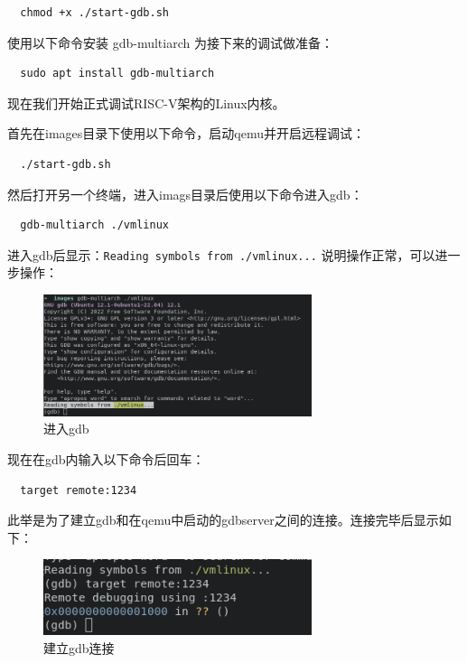 \documentclass[lang=cn,10pt]{elegantbook}
\begin{document}
\begin{lstlisting}
  chmod +x ./start-gdb.sh
\end{lstlisting}

使用以下命令安装 gdb-multiarch 为接下来的调试做准备：
\begin{lstlisting}
  sudo apt install gdb-multiarch
\end{lstlisting}

现在我们开始正式调试RISC-V架构的Linux内核。

首先在images目录下使用以下命令，启动qemu并开启远程调试：
\begin{lstlisting}
  ./start-gdb.sh
\end{lstlisting}

然后打开另一个终端，进入imags目录后使用以下命令进入gdb：

\begin{lstlisting}
  gdb-multiarch ./vmlinux
\end{lstlisting}

进入gdb后显示：\lstinline{Reading symbols from ./vmlinux...} 说明操作正常，可以进一步操作：

\begin{figure}[htbp]
  \centering
  \includegraphics[width=0.7\textwidth]{image/image-20231105111831194.png}
  \caption{进入gdb}
\end{figure}

现在在gdb内输入以下命令后回车：

\begin{lstlisting}
  target remote:1234
\end{lstlisting}

此举是为了建立gdb和在qemu中启动的gdbserver之间的连接。连接完毕后显示如下：

\begin{figure}[htbp]
  \centering
  \includegraphics[width=0.7\textwidth]{image/image-20231105112104038.png}
  \caption{建立gdb连接}
\end{figure}
\end{document}
